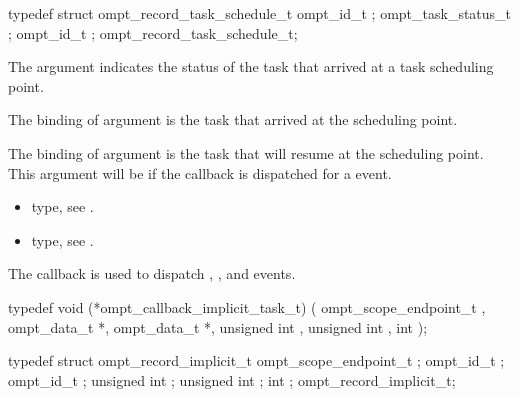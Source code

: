 \record

\begin{ccppspecific}
\begin{omptRecord}
typedef struct ompt_record_task_schedule_t {
  ompt_id_t ;
  ompt_task_status_t ;
  ompt_id_t ;
} ompt_record_task_schedule_t;
\end{omptRecord}
\end{ccppspecific}


\argdesc

The argument  indicates the status of
the task that arrived at a task scheduling point.

The binding of argument  is the task that
arrived at the scheduling point.

The binding of argument  is the task that
will resume at the scheduling point.
This argument will be  if the callback is dispatched for a
 event.

\crossreferences
\begin{itemize}
\item {} type, see
.

\item {} type, see
.
\end{itemize}



\label{sec:ompt_callback_implicit_task_t}
\summary
The  callback is used to dispatch
, , 
and  events.

\format

\begin{ccppspecific}
\begin{omptCallback}
typedef void (*ompt_callback_implicit_task_t) (
  ompt_scope_endpoint_t ,
  ompt_data_t *,
  ompt_data_t *,
  unsigned int ,
  unsigned int ,
  int 
);
\end{omptCallback}
\end{ccppspecific}


\record

\begin{ccppspecific}
\begin{omptRecord}
typedef struct ompt_record_implicit_t {
  ompt_scope_endpoint_t ;
  ompt_id_t ;
  ompt_id_t ;
  unsigned int ;
  unsigned int ;
  int ;
} ompt_record_implicit_t;
\end{omptRecord}
\end{ccppspecific}


